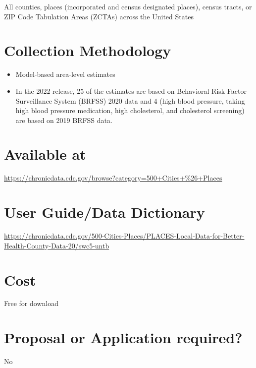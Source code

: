 \documentclass[
]{book}
\providecommand{\tightlist}{%
  \setlength{\itemsep}{0pt}\setlength{\parskip}{0pt}}
\begin{document}
All counties, places (incorporated and census designated places), census tracts, or ZIP Code Tabulation Areas (ZCTAs) across the United States

\hypertarget{collection-methodology-73}{%
\section{Collection Methodology}\label{collection-methodology-73}}

\begin{itemize}
\tightlist
\item
  Model-based area-level estimates
\item
  In the 2022 release, 25 of the estimates are based on Behavioral Risk Factor Surveillance System (BRFSS) 2020 data and 4 (high blood pressure, taking high blood pressure medication, high cholesterol, and cholesterol screening) are based on 2019 BRFSS data.
\end{itemize}

\hypertarget{available-at-73}{%
\section{Available at}\label{available-at-73}}

\url{https://chronicdata.cdc.gov/browse?category=500+Cities+\%26+Places}

\hypertarget{user-guidedata-dictionary-73}{%
\section{User Guide/Data Dictionary}\label{user-guidedata-dictionary-73}}

\url{https://chronicdata.cdc.gov/500-Cities-Places/PLACES-Local-Data-for-Better-Health-County-Data-20/swc5-untb}

\hypertarget{cost-73}{%
\section{Cost}\label{cost-73}}

Free for download

\hypertarget{proposal-or-application-required-73}{%
\section{Proposal or Application required?}\label{proposal-or-application-required-73}}

No
\end{document}
